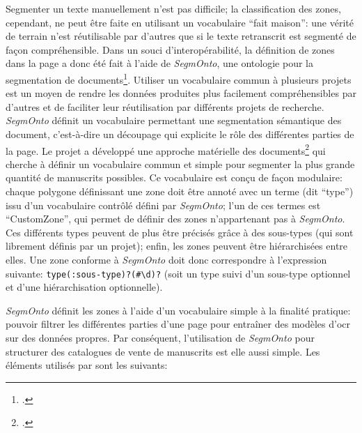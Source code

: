 Segmenter un texte manuellement n'est pas difficile; la classification des zones, cependant, ne peut être faite en utilisant un vocabulaire \enquote{fait maison}: une vérité de terrain n'est réutilisable par d'autres que si le texte retranscrit est segmenté de façon compréhensible. Dans un souci d'interopérabilité, la définition de zones dans la page a donc été fait à l'aide de \textit{SegmOnto}, une ontologie pour la segmentation de documents\footcite{christensen_segmonto_2022, gabay_segmonto_2021}. Utiliser un vocabulaire commun à plusieurs projets est un moyen de rendre les données produites plus facilement compréhensibles par d'autres et de faciliter leur réutilisation par différents projets de recherche. \textit{SegmOnto} définit un vocabulaire permettant une segmentation sémantique des document, c'est-à-dire un découpage qui explicite le rôle des différentes parties de la page. Le projet a développé une approche matérielle des documents\footcite{gabay_segmonto_2021} qui cherche à définir un vocabulaire commun et simple pour segmenter la plus grande quantité de manuscrits possibles. Ce vocabulaire est conçu de façon modulaire: chaque polygone définissant une zone doit être annoté avec un terme (dit \enquote{type}) issu d'un vocabulaire contrôlé défini par \textit{SegmOnto}; l'un de ces termes est \enquote{CustomZone}, qui permet de définir des zones n'appartenant pas à \textit{SegmOnto}. Ces différents types peuvent de plus être précisés grâce à des sous-types (qui sont librement définis par un projet); enfin, les zones peuvent être hiérarchisées entre elles. Une zone conforme à \textit{SegmOnto} doit donc correspondre à l'expression suivante: \texttt{type(:sous-type)?(\#\textbackslash{}d)?} (soit un type suivi d'un sous-type optionnel et d'une hiérarchisation optionnelle).

\textit{SegmOnto} définit les zones à l'aide d'un vocabulaire simple à la finalité pratique: pouvoir filtrer les différentes parties d'une page pour entraîner des modèles d'\gls{ocr} sur des données propres. Par conséquent, l'utilisation de \textit{SegmOnto} pour structurer des catalogues de vente de manuscrits est elle aussi simple. Les éléments utilisés par \ktb{} sont les suivants:

